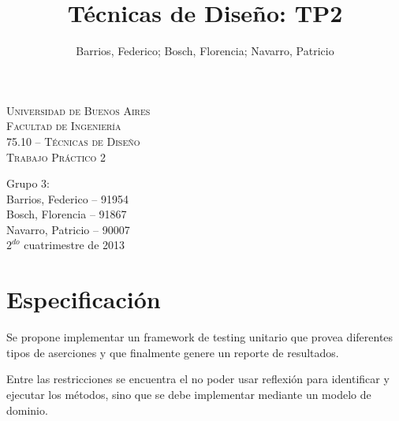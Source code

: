 \documentclass[12pt]{article}
\title{Técnicas de Diseño: TP2}
\author{Barrios, Federico; Bosch, Florencia; Navarro, Patricio}
\begin{document}
\begin{center}
\vspace*{7 cm}
\textsc{\LARGE Universidad de Buenos Aires}\\[0.3cm]
\textsc{\LARGE Facultad de Ingeniería}\\[1.2cm]
\textsc{\Large 75.10 -- Técnicas de Diseño}\\[0.3cm]
\textsc{\Large Trabajo Práctico 2}\\[1.2cm]
\end{center}

\begin{flushright}
{\large
Grupo 3:\\[0.1cm]
Barrios, Federico -- 91954\\
Bosch, Florencia -- 91867\\
Navarro, Patricio -- 90007\\[0.4cm]
$2^{do}$ cuatrimestre de 2013}
\end{flushright}

\thispagestyle{empty}

\newpage

\tableofcontents
\setcounter{page}{1}
\newpage

\section{Especificación}
Se propone implementar un framework de testing unitario que provea diferentes
tipos de aserciones y que finalmente genere un reporte de resultados.

Entre las restricciones se encuentra el no poder usar reflexión para identificar
y ejecutar los métodos, sino que se debe implementar mediante un modelo de 
dominio.
\end{document}
